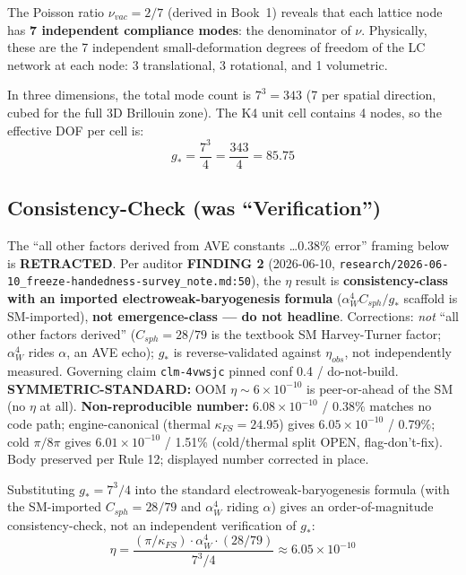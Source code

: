 The Poisson ratio $\nu_{vac} = 2/7$ (derived in Book~1) reveals
that each lattice node has \textbf{7 independent compliance modes}:
the denominator of $\nu$.  Physically, these are the 7 independent
small-deformation degrees of freedom of the LC network at each
node: 3 translational, 3 rotational, and 1 volumetric.

In three dimensions, the total mode count is $7^3 = 343$ (7 per
spatial direction, cubed for the full 3D Brillouin zone).  The
K4 unit cell contains 4 nodes, so the effective DOF per cell is:
\begin{equation}
    \boxed{g_* = \frac{7^3}{4} = \frac{343}{4} = 85.75}
\end{equation}

\subsection{Consistency-Check (was ``Verification'')}

\begin{warningbox}
\footnotesize
The ``all other factors derived from AVE constants \dots 0.38\% error''
framing below is \textbf{RETRACTED}. Per auditor \textbf{FINDING 2}
(2026-06-10, \texttt{research/2026-06-10\_freeze-handedness-survey\_note.md:50}),
the $\eta$ result is \textbf{consistency-class with an imported
electroweak-baryogenesis formula} ($\alpha_W^4 C_{sph}/g_*$ scaffold is
SM-imported), \textbf{not emergence-class --- do not headline}. Corrections:
\emph{not} ``all other factors derived'' ($C_{sph} = 28/79$ is the textbook SM
Harvey-Turner factor; $\alpha_W^4$ rides $\alpha$, an AVE echo); $g_*$ is
reverse-validated against $\eta_{obs}$, not independently measured. Governing
claim \texttt{clm-4vwsjc} pinned conf 0.4 / do-not-build.
\textbf{SYMMETRIC-STANDARD:} OOM $\eta \sim 6\times10^{-10}$ is peer-or-ahead of
the SM (no $\eta$ at all). \textbf{Non-reproducible number:}
$6.08\times10^{-10}$ / $0.38\%$ matches no code path; engine-canonical (thermal
$\kappa_{FS} = 24.95$) gives $6.05\times10^{-10}$ / 0.79\%; cold $\pi/8\pi$
gives $6.01\times10^{-10}$ / 1.51\% (cold/thermal split OPEN, flag-don't-fix).
Body preserved per Rule 12; displayed number corrected in place.
\end{warningbox}

Substituting $g_* = 7^3/4$ into the standard electroweak-baryogenesis
formula (with the SM-imported $C_{sph} = 28/79$ and $\alpha_W^4$ riding
$\alpha$) gives an order-of-magnitude consistency-check, not an independent
verification of $g_*$:
\begin{equation}
    \eta = \frac{(\pi/\kappa_{FS}) \cdot \alpha_W^4 \cdot (28/79)}{7^3/4}
    \approx 6.05 \times 10^{-10}
\end{equation}

